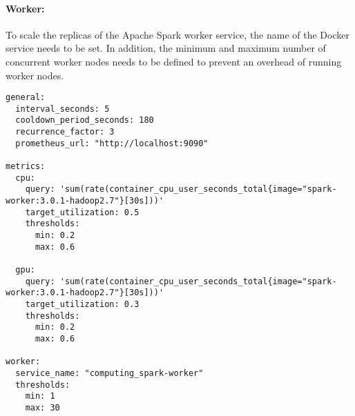 \paragraph{Worker:}
To scale the replicas of the Apache Spark worker service, the name of the Docker service needs to be set. In addition, the minimum and maximum number of concurrent worker nodes needs to be defined to prevent an overhead of running worker nodes.


\begin{lstlisting}[label=lst:06_auto-scaler_config_example, caption=Auto-Scaler configuration YAML file]
general:
  interval_seconds: 5
  cooldown_period_seconds: 180
  recurrence_factor: 3
  prometheus_url: "http://localhost:9090"
 
metrics:
  cpu:
    query: 'sum(rate(container_cpu_user_seconds_total{image="spark-worker:3.0.1-hadoop2.7"}[30s]))'
    target_utilization: 0.5
    thresholds:
      min: 0.2
      max: 0.6
  
  gpu:
    query: 'sum(rate(container_cpu_user_seconds_total{image="spark-worker:3.0.1-hadoop2.7"}[30s]))'
    target_utilization: 0.3
    thresholds:
      min: 0.2
      max: 0.6
 
worker:
  service_name: "computing_spark-worker"
  thresholds:
    min: 1
    max: 30
\end{lstlisting}


